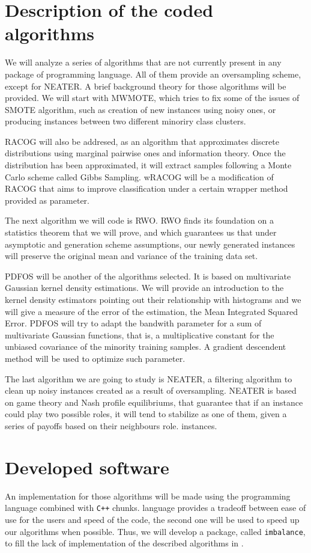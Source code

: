 \section*{Description of the coded algorithms}

We will analyze a series of algorithms that are not currently present in any package of \R programming language. All of
them provide an oversampling scheme, except for NEATER. A brief background theory for those algorithms will be provided.
We will start with MWMOTE, which tries to fix some of the issues of SMOTE algorithm, such as creation of new instances 
using noisy ones, or producing instances between two different minoriry class clusters.

RACOG will also be addresed, as an algorithm that approximates discrete distributions using marginal pairwise ones and 
information theory. Once the distribution has been approximated, it will extract samples following a Monte Carlo scheme
called Gibbs Sampling. wRACOG will be a modification of RACOG that aims to improve classification under a certain wrapper
method provided as parameter.

The next algorithm we will code is RWO. RWO finds its foundation on a statistics theorem that we will prove, and which guarantees
us that under asymptotic and generation scheme assumptions, our newly generated instances will preserve the original mean
and variance of the training data set.

PDFOS will be another of the algorithms selected. It is based on multivariate Gaussian kernel density estimations. We will
provide an introduction to the kernel density estimators pointing out their relationship with histograms and we will give
a measure of the error of the estimation, the Mean Integrated Squared Error. PDFOS will try to adapt the bandwith parameter
for a sum of multivariate Gaussian functions, that is, a multiplicative constant for the unbiased covariance of the minority
training samples. A gradient descendent method will be used to optimize such parameter.

The last algorithm we are going to study is NEATER, a filtering algorithm to clean up noisy instances created as a result of
oversampling. NEATER is based on game theory and Nash profile equilibriums, that guarantee that if an instance could play
two possible roles, it will tend to stabilize as one of them, given a series of payoffs based on their neighbours role.
instances.

\section*{Developed software}
An implementation for those algorithms will be made using the \R programming language combined with \texttt{C++} chunks. 
\R language provides a tradeoff between ease of use for the users and speed of the code, the second one will be used to 
speed up our algorithms when possible. Thus, we will develop a package, called \texttt{imbalance}, to fill the lack of implementation of the 
described algorithms in \R.

